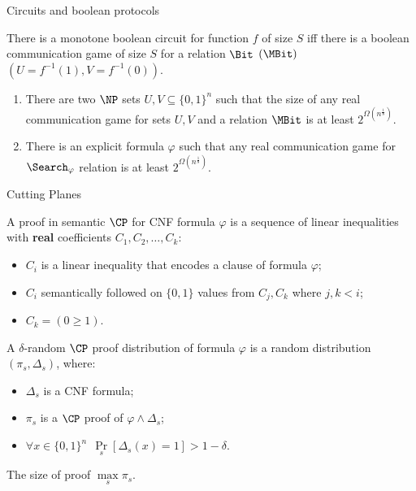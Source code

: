\begin{frame}{Circuits and boolean protocols}

    \begin{theorem}
        There is a {\color{blue} monotone} boolean circuit for function $f$ of size $S$ iff there is a
        boolean communication game of size $S$ for a relation $\Bit$ {\color{blue}$(\MBit)$} $(U =
        f^{-1}(1), V = f^{-1}(0))$.
    \end{theorem}

    \pause

    \begin{theorem}
        \begin{enumerate}
            \item There are two $\NP$ sets $U, V \subseteq \{0, 1\}^n$ such that the size of any real
                communication game for sets $U, V$ and a relation $\MBit$ is at least
                $2^{\Omega(n^{\frac{1}{8}})}$.
            \item There is an explicit formula $\varphi$ such that any real communication game for
                $\Search_{\varphi}$ relation is at least $2^{\Omega(n^{\frac{1}{8}})}$.
        \end{enumerate}
    \end{theorem}
\end{frame}



\begin{frame}{Cutting Planes}

    A proof in semantic $\CP$ for CNF formula $\varphi$ is a sequence of linear inequalities with \textbf{real} coefficients
    $C_1, C_2, \dots, C_k$:
    \begin{itemize}
        \item $C_i$ is a linear inequality that encodes a clause of formula $\varphi$;
        \item $C_i$ semantically followed on $\{0, 1\}$ values from $C_j, C_k$ where $j, k < i$;
        \item $C_k = (0 \ge 1)$.
    \end{itemize}

    \pause

    \vspace{0.5cm}

    A $\delta$-random $\CP$ proof distribution of formula $\varphi$ is a random distribution $(\pi_s, \Delta_s)$, where:
    \begin{itemize}
        \item $\Delta_s$ is a CNF formula;
        \item $\pi_s$ is a $\CP$ proof of $\varphi \land \Delta_s$;
        \item $\forall x \in \{0, 1\}^n ~~ \Pr\limits_s[\Delta_s(x) = 1] > 1 - \delta$.
    \end{itemize}

    The size of proof $\max\limits_s \pi_s$.
\end{frame}


